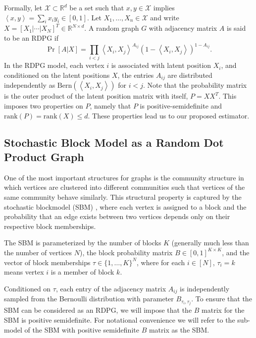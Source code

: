 \documentclass[10pt,letterpaper]{article}
\renewcommand{\Re}{\mathbb{R}}
\begin{document}
Formally, let $\mathcal{X} \subset \Re^d$ be a set such that $x, y \in \mathcal{X}$ implies $\left \langle  x,y \right \rangle =\sum_i x_i y_i \in [0, 1]$.
Let $X_1,\dotsc,X_n\in \mathcal{X}$ and write $X = [X_1|\cdots|X_N]^T \in \Re^{N \times d}$.
A random graph $G$ with adjacency matrix $A$ is said to be an RDPG if
\[
    \Pr[A|X] = \prod_{i<j} \left \langle X_i, X_j \right \rangle^{A_{ij}} \left( 1 - \left \langle X_i, X_j \right \rangle \right)^{1 - A_{ij}}.
\]
In the RDPG model, each vertex $i$ is associated with latent position $X_i$, and conditioned on the latent positions $X$, the entries $A_{ij}$ are distributed independently as $ \text{Bern}(\left \langle X_i, X_j \right \rangle)$ for $i<j$.
Note that the probability matrix is the outer product of the latent position matrix with itself, $P = X X^T$.
This imposes two properties on $P$, namely that $P$ is positive-semidefinite and $\mathrm{rank}(P)=\mathrm{rank}(X)\leq d$.
These properties lead us to our proposed estimator.



\subsection{Stochastic Block Model as a Random Dot Product Graph}
\label{section:sbm_rdpg}
One of the most important structures for graphs is the community structure in which vertices are clustered into different communities such that vertices of the same community behave similarly. This structural property is captured by the stochastic blockmodel (SBM) \cite{holland1983stochastic}, where each vertex is assigned to a block and the probability that an edge exists between two vertices depends only on their respective block memberships.

The SBM is parameterized by the number of blocks $K$ (generally much less than the number of vertices $N$), the block probability matrix $B \in [0,1]^{K \times K}$, and the vector of block memberships
$\tau\in\{1,\dotsc,K\}^N$, where for each $i \in [N]$, $\tau_i = k$ means vertex $i$ is a member of block $k$.

Conditioned on $\tau$, each entry of the adjacency matrix $A_{ij}$ is independently sampled from the Bernoulli distribution with parameter $B_{\tau_i,\tau_j}$.
To ensure that the SBM can be considered as an RDPG, we will impose that the $B$ matrix for the SBM is positive semidefinite. 
For notational convenience we will refer to the sub-model of the SBM with positive semidefinite $B$ matrix as the SBM.
\end{document}
